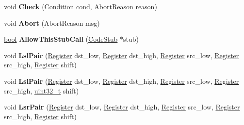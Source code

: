 \begin{DoxyCompactItemize}
\mbox{\label{classv8_1_1internal_1_1TurboAssembler_a158fac24257ccf8960ffa9cddc555507}} 
void {\bfseries Check} (Condition cond, Abort\+Reason reason)
\item 
\mbox{\label{classv8_1_1internal_1_1TurboAssembler_affb66d8256fd531cd6747647a475a4df}} 
void {\bfseries Abort} (Abort\+Reason msg)
\item 
\mbox{\label{classv8_1_1internal_1_1TurboAssembler_a20348b464d89447388016d14eb6cb7e3}} 
\mbox{\hyperlink{classbool}{bool}} {\bfseries Allow\+This\+Stub\+Call} (\mbox{\hyperlink{classv8_1_1internal_1_1CodeStub}{Code\+Stub}} $\ast$stub)
\item 
\mbox{\label{classv8_1_1internal_1_1TurboAssembler_aad38a8b79457e70a1d49b202d51a9ac1}} 
void {\bfseries Lsl\+Pair} (\mbox{\hyperlink{classv8_1_1internal_1_1Register}{Register}} dst\+\_\+low, \mbox{\hyperlink{classv8_1_1internal_1_1Register}{Register}} dst\+\_\+high, \mbox{\hyperlink{classv8_1_1internal_1_1Register}{Register}} src\+\_\+low, \mbox{\hyperlink{classv8_1_1internal_1_1Register}{Register}} src\+\_\+high, \mbox{\hyperlink{classv8_1_1internal_1_1Register}{Register}} shift)
\item 
\mbox{\label{classv8_1_1internal_1_1TurboAssembler_aefd9524af7a3cad1b2e8916a4a34c1ff}} 
void {\bfseries Lsl\+Pair} (\mbox{\hyperlink{classv8_1_1internal_1_1Register}{Register}} dst\+\_\+low, \mbox{\hyperlink{classv8_1_1internal_1_1Register}{Register}} dst\+\_\+high, \mbox{\hyperlink{classv8_1_1internal_1_1Register}{Register}} src\+\_\+low, \mbox{\hyperlink{classv8_1_1internal_1_1Register}{Register}} src\+\_\+high, \mbox{\hyperlink{classuint32__t}{uint32\+\_\+t}} shift)
\item 
\mbox{\label{classv8_1_1internal_1_1TurboAssembler_ad7987c84b3da5f25aa8e4d5f7715b7a8}} 
void {\bfseries Lsr\+Pair} (\mbox{\hyperlink{classv8_1_1internal_1_1Register}{Register}} dst\+\_\+low, \mbox{\hyperlink{classv8_1_1internal_1_1Register}{Register}} dst\+\_\+high, \mbox{\hyperlink{classv8_1_1internal_1_1Register}{Register}} src\+\_\+low, \mbox{\hyperlink{classv8_1_1internal_1_1Register}{Register}} src\+\_\+high, \mbox{\hyperlink{classv8_1_1internal_1_1Register}{Register}} shift)

\end{DoxyCompactItemize}
